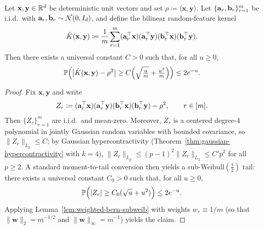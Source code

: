 \begin{lemma}\label{lem:chaos-centered-conditional}
Let $\mathbf{x},\mathbf{y} \in \mathbb{R}^d$ be deterministic unit vectors and set $\rho \coloneqq \langle \mathbf{x}, \mathbf{y}\rangle$.
Let $\{{\mathbf{a}}_{r},{\mathbf{b}}_{r}\}_{r=1}^m$ be i.i.d.\ with ${\mathbf{a}}_{r},{\mathbf{b}}_{r} \sim \mathcal{N}(0,I_{d})$, and define the bilinear random-feature kernel
\[
    \hat K(\mathbf{x},\mathbf{y}) \coloneqq \frac1m \sum_{r=1}^m ({\mathbf{a}}_{r}^\top \mathbf{x})({\mathbf{a}}_{r}^\top \mathbf{y})({\mathbf{b}}_{r}^\top \mathbf{x})({\mathbf{b}}_{r}^\top \mathbf{y}).
\]
Then there exists a universal constant $C>0$ such that, for all $u \ge 0$,
\[
    \mathbb{P}\Big(
        \big|\hat K(\mathbf{x},\mathbf{y}) - \rho^2\big|
        \ge
        C\Big(\sqrt{\tfrac{u}{m}} + \tfrac{u^2}{m}\Big)
    \Big)
    \le 2e^{-u}.
\]
\end{lemma}
\begin{proof}
Fix $\mathbf{x},\mathbf{y}$ and write
\[
    Z_{r} \coloneqq ({\mathbf{a}}_{r}^\top \mathbf{x})({\mathbf{a}}_{r}^\top \mathbf{y})({\mathbf{b}}_{r}^\top \mathbf{x})({\mathbf{b}}_{r}^\top \mathbf{y}) - \rho^2,
    \qquad r\in[m].
\]
Then $\{Z_{r}\}_{r=1}^m$ are i.i.d.\ and mean-zero.
Moreover, $Z_{r}$ is a centered degree-$4$ polynomial in jointly Gaussian random variables with bounded covariance, so $\|Z_{r}\|_{L_2}\le C$; by Gaussian hypercontractivity (Theorem~\ref{thm:gaussian-hypercontractivity} with $k=4$), $\|Z_{r}\|_{L_p}\le (p-1)^2\|Z_{r}\|_{L_2}\le C'p^2$ for all $p\ge2$. A standard moment-to-tail conversion then yields a sub-Weibull$(\tfrac12)$ tail: there exists a universal constant $C_{0}>0$ such that, for all $u\ge 0$,
\[
    \mathbb{P}\Big( |Z_{r}| \ge C_{0}(\sqrt{u} + u^2)\Big) \le 2e^{-u}.
\]
Applying Lemma~\ref{lem:weighted-bern-subweib} with weights $w_{r} \equiv 1/m$ (so that $\|\mathbf{w}\|_{2} = m^{-1/2}$ and $\|\mathbf{w}\|_\infty = m^{-1}$) yields the claim.
\end{proof}

